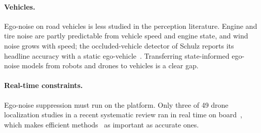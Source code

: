 \paragraph{Vehicles.}
Ego-noise on road vehicles is less studied in the perception literature.
Engine and tire noise are partly predictable from vehicle speed and engine state, and wind noise grows with speed; the occluded-vehicle detector of Schulz \etal reports its headline accuracy with a static ego-vehicle~\cite{schulz2021hearing}.
Transferring state-informed ego-noise models from robots and drones to vehicles is a clear gap.

\paragraph{Real-time constraints.}
Ego-noise suppression must run on the platform.
Only three of 49 drone localization studies in a recent systematic review ran in real time on board~\cite{chevtchenko2025review}, which makes efficient methods~\cite{grondin2019lightweight,grondin2022odas} as important as accurate ones.
